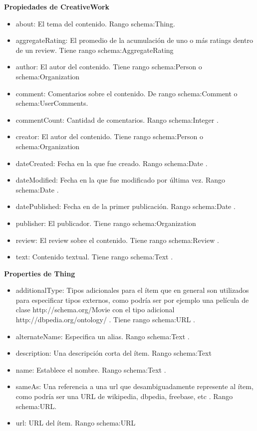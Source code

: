 \noindent \textbf{Propiedades de CreativeWork}\\
 \begin{itemize}
  \item about: El tema del contenido. Rango schema:Thing. 
  \item aggregateRating: El promedio de la acumulación de uno o más ratings dentro de un review. Tiene rango schema:AggregateRating 
  \item author: El autor del contenido. Tiene rango schema:Person o \\\noindent schema:Organization
  \item comment: Comentarios sobre el contenido. De rango schema:Comment o schema:UserComments.
  \item commentCount: Cantidad de comentarios. Rango schema:Integer . 
  \item creator: El autor del contenido. Tiene rango schema:Person o \\\noindent schema:Organization
  \item dateCreated: Fecha en la que fue creado. Rango schema:Date .
  \item dateModified: Fecha en la que fue modificado por última vez. Rango schema:Date .
  \item datePublished: Fecha en de la primer publicación. Rango schema:Date .
  \item publisher: El publicador. Tiene rango schema:Organization
  \item review: El review sobre el contenido. Tiene rango schema:Review .
  \item text: Contenido textual. Tiene rango schema:Text .
 \end{itemize}

\noindent \textbf{Properties de Thing}\\
 \begin{itemize}
  \item additionalType: Tipos adicionales para el ítem que en general son utilizados para especificar tipos externos, como podría ser por ejemplo una película de clase http://schema.org/Movie con el tipo adicional \\\noindent  http://dbpedia.org/ontology/ . Tiene rango schema:URL .
  \item alternateName: Especifica un alias. Rango schema:Text .
  \item description: Una descripción corta del ítem. Rango schema:Text 
  \item name: Establece el nombre. Rango schema:Text .
  \item sameAs: Una referencia a una url que desambiguadamente represente al ítem, como podría ser una URL de wikipedia, dbpedia, freebase, etc . Rango schema:URL.
  \item url: URL del ítem. Rango schema:URL
 \end{itemize}

